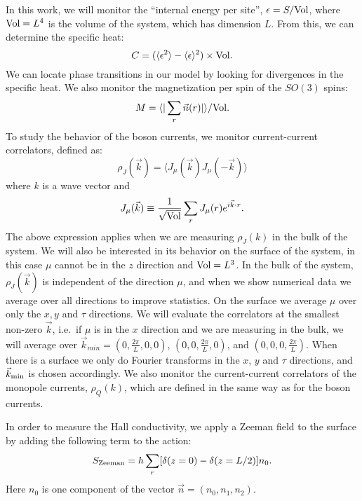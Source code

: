 \documentclass[prb,twocolumn]{revtex4}
\def\ra{\rangle} %
\def\la{\langle} %
\begin{document}
In this work, we will monitor the ``internal energy per site'', $\epsilon= S /{\rm Vol}$, where ${\rm Vol}=L^4$ is the volume of the system, which has dimension $L$. From this, we can determine the specific heat:
\begin{equation}
C=(\la \epsilon^2\ra-\la\epsilon\ra^2)\times{\rm Vol}.
\end{equation}
We can locate phase transitions in our model by looking for divergences in the specific heat. We also monitor the magnetization per spin of the $SO(3)$ spins:
\begin{equation}
M=\la |\sum_r \vec{n}(r)|\ra/{\rm Vol}.
\end{equation}
To study the behavior of the boson currents, we monitor current-current correlators, defined as:
\begin{equation}
\rho_J(\vec{k})=\la J_\mu(\vec{k})J_\mu(-\vec{k})\ra
\end{equation}
where $k$ is a wave vector and 
\begin{equation}
J_\mu(\vec{k})\equiv\frac{1}{\rm \sqrt{Vol}}\sum_r J_\mu(r)e^{i\vec{k}\cdot r}.
\end{equation}
The above expression applies when we are measuring $\rho_J(k)$ in the bulk of the system. We will also be interested in its behavior on the surface of the system, in this case $\mu$ cannot be in the $z$ direction and ${\rm Vol}=L^3$.  
In the bulk of the system, $\rho_J(\vec{k})$ is independent of the direction $\mu$, and when we show numerical data we average over all directions to improve statistics. On the surface we average $\mu$ over only the $x,y$ and $\tau$ directions. We will evaluate the correlators at the smallest non-zero $\vec{k}$, i.e.~if $\mu$ is in the $x$ direction and we are measuring in the bulk, we will average over $\vec{k}_{min}=(0,\frac{2\pi}{L},0,0)$, $(0,0,\frac{2\pi}{L},0)$, and $(0,0,0,\frac{2\pi}{L})$. When there is a surface we only do Fourier transforms in the $x$, $y$ and $\tau$ directions, and $\vec{k}_{\rm min}$ is chosen accordingly. We also monitor the current-current correlators of the monopole currents, $\rho_Q(k)$, which are defined in the same way as for the boson currents.

In order to measure the Hall conductivity, we apply a Zeeman field to the surface by adding the following term to the action:
\begin{equation}
S_{\rm Zeeman}=h\sum_r [\delta(z=0)-\delta(z=L/2)] n_0.
\label{Zeeman}
\end{equation}
Here $n_0$ is one component of the vector $\vec{n}=(n_0,n_1,n_2)$. 
\end{document}
